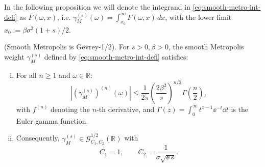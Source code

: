 In the following proposition we will denote the integrand in \eqref{eq:smooth-metro-int-defi} as $F(\omega, x)$, i.e. $\gamma_M^{(s)}(\omega) = \int_{x_0}^\infty F(\omega, x)\,dx$, with the lower limit $x_0 := \beta \sigma^2 (1 + s) / 2$.
\begin{proposition} \label{prop:smooth-metro-gevrey}
    \textup{(Smooth Metropolis is Gevrey-1/2).} For $s > 0, \beta > 0$, the smooth Metropolis weight $\gamma^{(s)}_M$ defined by \eqref{eq:smooth-metro-int-defi} satisfies:
    \begin{enumerate}[(i)]
        \item For all $n\geq 1$ and $\omega \in \mathbb{R}$:
        \[
        \left|\left(\gamma_M^{(s)}\right)^{(n)}(\omega)\right| \leq \frac{1}{2\pi}\left(\frac{2\beta^2}{s}\right)^{n/2} \Gamma\!\left(\frac{n}{2}\right),
        \]
        with $f^{(n)}$ denoting the $n$-th derivative, and $\Gamma(z) = \int_{0}^{\infty} t^{z - 1} \ee^{-t} \dd t$ is the Euler gamma function.
        \item Consequently, $\gamma_M^{(s)} \in \mathcal{G}^{1/2}_{C_1, C_2}(\mathbb{R})$ with 
        \[
        C_1 = 1, \qquad C_2 = \frac{1}{\sigma\sqrt{\ee\,s}}.
        \]
    \end{enumerate}
\end{proposition}
